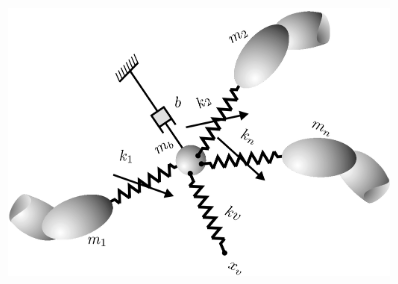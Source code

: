 \documentclass[student]{ITRslides}
\begin{document}
\begin{frame}
\begin{columns}

             \begin{figure}[htb]
			\centering
			\includegraphics[width=0.9\textwidth]{IPCsprings.png}
			\end{figure}
		\end{columns}

\end{frame}
\end{document}

